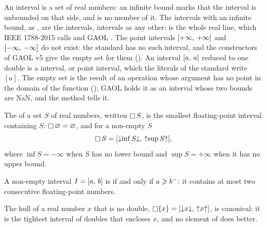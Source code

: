 An interval is a set of real numbers: an infinite bound marks that the
interval is unbounded on that side, and is no member of it. The intervals
with an infinite bound, as , are the 
intervals, intervals as any other; \itv{-\infty}{+\infty} is the whole real
line, which IEEE 1788-2015 calls  and GAOL
. The point intervals $[+\infty,\,+\infty]$
and $[-\infty,\,-\infty]$ do not exist: the standard has no such
interval, and the constructors of GAOL v5 give the empty set for them
().\newinvfive{} An interval $[a,\,a]$ reduced to
one double is a  interval, or point interval, which the
literals of the standard write $[a]$. The empty set is the result of an
operation whose argument has no point in the domain of the function
(); GAOL holds it as an interval whose two
bounds are NaN, and the method  tells it.
%

\begin{Def}[Hull]\label{def:hull}
%
The  of a set $S$ of real numbers, written $\mathop{\Box} S$, is the
smallest floating-point interval containing $S$: $\mathop{\Box} \varnothing=
\varnothing$, and for a non-empty $S$
\begin{equation*}
  \mathop{\Box} S=[\mathopen{\downarrow}\inf S\mathclose{\downarrow},\,\mathopen{\uparrow}\sup S\mathclose{\uparrow}],
\end{equation*}
where $\inf S=-\infty$ when $S$ has no lower bound and $\sup S=+\infty$ when
it has no upper bound.
\end{Def}

\begin{Def}\label{def:canonical}
%
%
A non-empty interval $I=[a,\,b]$ is  if and only if
$a\geqslant{b}^-$: it contains at most two consecutive floating-point
numbers.
\end{Def}

The hull of a real number $x$ that is no double,
$\mathop{\Box} \{x\}=[\mathopen{\downarrow}x\mathclose{\downarrow},\,\mathopen{\uparrow}x\mathclose{\uparrow}]$, is canonical: it is the
tightest interval of doubles that encloses $x$, and no element of \ISet{}
does better.

